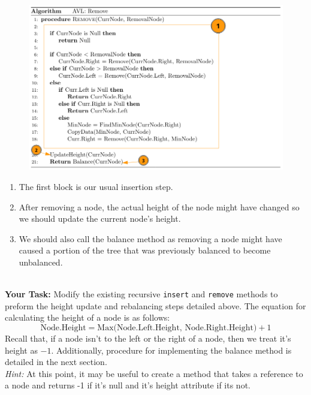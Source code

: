 \documentclass[a4paper]{article}
\begin{document}
\begin{minipage}{0.49\textwidth}
    \begin{figure}[H]
        \includegraphics[width=\textwidth]{./images/avl-remove-algo-annotated.png}
    \end{figure}
\end{minipage}
\begin{minipage}{0.49\textwidth}
    \small
    \begin{enumerate}[1)]
        \item The first block is our usual insertion step. 
        \item After removing a node, the actual height of the node might have changed so we should update the current node's height.
        \item We should also call the balance method as removing a node might have caused a portion of the tree that was previously balanced to become unbalanced.
    \end{enumerate}
\end{minipage}
\vspace{0.2cm}\\
\textbf{Your Task:} Modify the existing recursive \lstinline|insert| and \lstinline|remove| methods to preform the height update and rebalancing steps detailed above. The equation for calculating the height of a node is as follows:
\[\text{Node.Height} = \text{Max(Node.Left.Height, Node.Right.Height)} + 1\]
Recall that, if a node isn't to the left or the right of a node, then we treat
it's height as $-1$.  Additionally, procedure for implementing the balance
method is detailed in the next section.\\

\textit{Hint:} At this point, it may be useful to create a method that takes a
reference to a node and returns -1 if it's null and it's height attribute if
its not.
\end{document}
